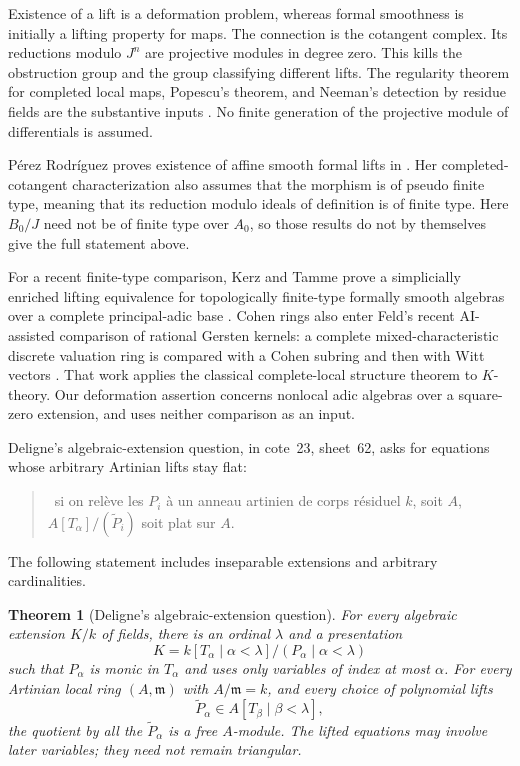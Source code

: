 \documentclass[11pt]{article}
\newtheorem{theorem}{Theorem}[section]
\theoremstyle{definition}\newtheorem{definition}[theorem]{Definition}
\theoremstyle{remark}\newtheorem{remark}[theorem]{Remark}
\begin{document}
Existence of a lift is a deformation problem, whereas formal smoothness is initially a lifting property for maps. The connection is the cotangent complex. Its reductions modulo $J^n$ are projective modules in degree zero. This kills the obstruction group and the group classifying different lifts. The regularity theorem for completed local maps, Popescu's theorem, and Neeman's detection by residue fields are the substantive inputs \cite[15.50.2, 16.12.1]{Stacks}\cite[Lemma 2.12, p.~527]{Neeman}. No finite generation of the projective module of differentials is assumed.

P\'erez Rodr\'iguez proves existence of affine smooth formal lifts in \cite[Definition~1.3 and Corollary~4.3; author version, pp.~3 and~13]{Perez2008}. Her completed-cotangent characterization \cite[Proposition~5.1; author version, p.~21]{Perez2016} also assumes that the morphism is of pseudo finite type, meaning that its reduction modulo ideals of definition is of finite type. Here $B_0/J$ need not be of finite type over $A_0$, so those results do not by themselves give the full statement above.

For a recent finite-type comparison, Kerz and Tamme prove a simplicially enriched lifting equivalence for topologically finite-type formally smooth algebras over a complete principal-adic base \cite[\S3, Proposition~3.1, pp.~3--4]{KerzTamme}. Cohen rings also enter Feld's recent AI-assisted comparison of rational Gersten kernels: a complete mixed-characteristic discrete valuation ring is compared with a Cohen subring and then with Witt vectors \cite[Theorem~1.1, p.~2, and Corollary~4.3, p.~12]{FeldCohen}. That work applies the classical complete-local structure theorem to $K$-theory. Our deformation assertion concerns nonlocal adic algebras over a square-zero extension, and uses neither comparison as an input.

Deligne's algebraic-extension question, in cote~23, sheet~62, asks for equations whose arbitrary Artinian lifts stay flat:
\begin{quote}
\guillemotleft\ si on rel\`eve les $P_i$ \`a un anneau artinien de corps r\'esiduel $k$, soit $A$, $A[T_\alpha]/(\widetilde P_i)$ soit plat sur $A$\guillemotright.
\end{quote}
The following statement includes inseparable extensions and arbitrary cardinalities.

\begin{theorem}[Deligne's algebraic-extension question]\label{thm:triangular}
For every algebraic extension $K/k$ of fields, there is an ordinal $\lambda$ and a presentation
\[
 K=k[T_\alpha\mid\alpha<\lambda]/(P_\alpha\mid\alpha<\lambda)
\]
such that $P_\alpha$ is monic in $T_\alpha$ and uses only variables of index at most $\alpha$. For every Artinian local ring $(A,\mathfrak m)$ with $A/\mathfrak m=k$, and every choice of polynomial lifts
\[
 \widetilde P_\alpha\in A[T_\beta\mid\beta<\lambda],
\]
the quotient by all the $\widetilde P_\alpha$ is a free $A$-module. The lifted equations may involve later variables; they need not remain triangular.
\end{theorem}
\end{document}

